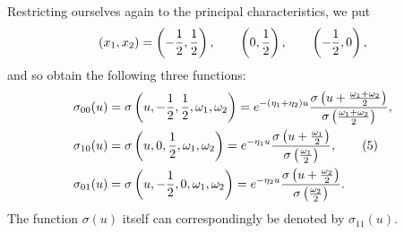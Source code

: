 \documentclass[11pt]{article}
\begin{document}
Restricting ourselves again to the principal characteristics, we put
\[
(x_1,x_2)=\left(-{1\over2},{1\over2}\right),
\qquad
\left(0,{1\over2}\right),
\qquad
\left(-{1\over2},0\right),
\]
and so obtain the following three functions:
\begin{align}
\sigma_{00}(u)&=\sigma\left(u,-{1\over2},{1\over2},\omega_1,
\omega_2\right)
=e^{-(\eta_1+
\eta_2)u}{\sigma\left(u+{\omega_1+
\omega_2\over2}\right)
\over \sigma\left({\omega_1+
\omega_2\over2}\right)},\notag\\
\sigma_{10}(u)&=\sigma\left(u,0,{1\over2},\omega_1,
\omega_2\right)
=e^{-\eta_1 u}{\sigma\left(u+{\omega_1\over2}\right)
\over \sigma\left({\omega_1\over2}\right)}, \tag{5}\\
\sigma_{01}(u)&=\sigma\left(u,-{1\over2},0,
\omega_1,
\omega_2\right)
=e^{-\eta_2 u}{\sigma\left(u+{\omega_2\over2}\right)
\over \sigma\left({\omega_2\over2}\right)}.\notag
\end{align}
The function $\sigma(u)$ itself can correspondingly be denoted by $\sigma_{11}(u)$.
\end{document}
